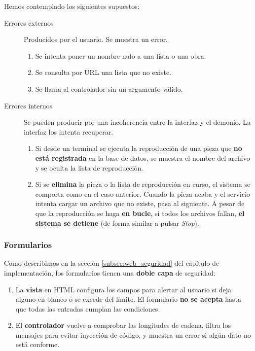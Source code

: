 Hemos contemplado los siguientes supuestos:

\begin{description}
	\item[Errores externos] Producidos por el usuario. Se muestra un error.
	
	\begin{enumerate}
		\item Se intenta poner un nombre nulo a una lista o una obra.
		\item Se consulta por \acrshort{URL} una lista que no existe.
		\item Se llama al controlador sin un argumento válido.
	\end{enumerate}
	
	\item[Errores internos] Se pueden producir por una incoherencia entre la interfaz y el demonio. La interfaz los intenta recuperar.
	
	\begin{enumerate}
		\item Si desde un terminal se ejecuta la reproducción de una pieza que \textbf{no está registrada} en la base de datos, se muestra el nombre del archivo y se oculta la lista de reproducción.
		
		\item Si se \textbf{elimina} la pieza o la lista de reproducción en curso, el sistema se comporta como en el caso anterior. Cuando la pieza acaba y el servicio intenta cargar un archivo que no existe, pasa al siguiente. A pesar de que la reproducción se haga \textbf{en bucle}, si todos los archivos fallan, \textbf{el sistema se detiene} (de forma similar a pulsar \textit{Stop}).
	\end{enumerate}
\end{description}

\subsubsection{Formularios}

Como describimos en la sección \ref{subsec:web_seguridad} del capítulo de implementación, los formularios tienen una \textbf{doble capa} de seguridad:

\begin{enumerate}
	\item La \textbf{vista} en \acrshort{HTML} configura los campos para alertar al usuario si deja alguno en blanco o se excede del límite. El formulario \textbf{no se acepta} hasta que todas las entradas cumplan las condiciones.
	
	\item El \textbf{controlador} vuelve a comprobar las longitudes de cadena, filtra los mensajes para evitar inyección de código, y muestra un error si algún dato no está conforme.
\end{enumerate}

